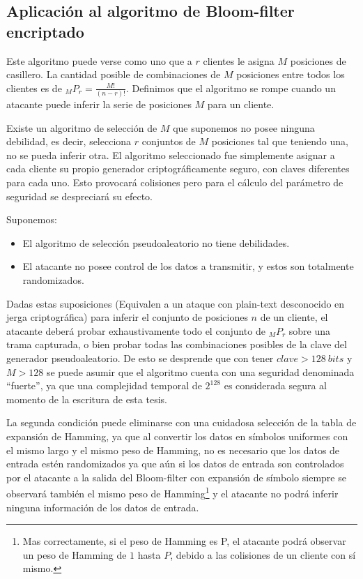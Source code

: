 \subsection{Aplicación al algoritmo de Bloom-filter encriptado}

Este algoritmo puede verse como uno que a $r$ clientes le asigna $M$ posiciones de casillero.
La cantidad posible de combinaciones de $M$ posiciones entre todos los clientes es de $ _{M}P_{r} = \frac{M!}{(n-r)!} $.
Definimos que el algoritmo se rompe cuando un atacante puede inferir la serie de posiciones $M$ para un cliente.

Existe un algoritmo de selección de $M$ que suponemos no posee ninguna debilidad, es decir, selecciona $r$ conjuntos de $M$ posiciones tal que teniendo una, no se pueda inferir otra.
El algoritmo seleccionado fue simplemente asignar a cada cliente su propio generador criptográficamente seguro, con claves diferentes para cada uno. Esto provocará colisiones pero para el cálculo del parámetro de seguridad se despreciará su efecto.

Suponemos:
\begin{itemize}
 \item El algoritmo de selección pseudoaleatorio no tiene debilidades.
 \item El atacante no posee control de los datos a transmitir, y estos son totalmente randomizados.
\end{itemize}

Dadas estas suposiciones (Equivalen a un ataque con plain-text desconocido en jerga criptográfica) para inferir el conjunto de posiciones $n$ de un cliente, el atacante deberá probar exhaustivamente todo el conjunto de $ _{M}P_{r}$ sobre una trama capturada, o bien probar todas las combinaciones posibles de la clave del generador pseudoaleatorio. De esto se desprende que con tener $clave>128\ bits$ y $M>128$ se puede asumir que el algoritmo cuenta con una seguridad denominada ``fuerte'', ya que una complejidad temporal de $2 ^{128}$ es considerada segura al momento de la escritura de esta tesis.

La segunda condición puede eliminarse con una cuidadosa selección de la tabla de expansión de Hamming, ya que al convertir los datos en símbolos uniformes con el mismo largo y el mismo peso de Hamming, no es necesario que los datos de entrada estén randomizados ya que aún si los datos de entrada son controlados por el atacante a la salida del Bloom-filter con expansión de símbolo siempre se observará también el mismo peso de Hamming\footnote{Mas correctamente, si el peso de Hamming es P, el atacante podrá observar un peso de Hamming de $1$ hasta $P$, debido a las colisiones de un cliente con sí mismo.} y el atacante no podrá inferir ninguna información de los datos de entrada.

